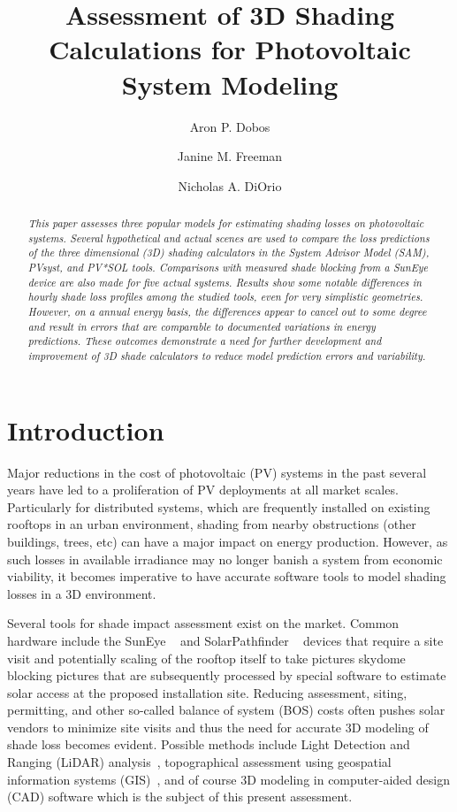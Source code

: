 \documentclass[twocolumn,10pt]{asme2ej}
\title{Assessment of 3D Shading Calculations for Photovoltaic System Modeling}
\author{Aron P. Dobos
    \affiliation{
	Senior Engineer, NREL\\
	aron.dobos@nrel.gov
    }	
}
\author{Janine M. Freeman
    \affiliation{
	Energy Modeling Engineer, NREL\\
	janine.freeman@nrel.gov
    }	
}
\author{Nicholas A. DiOrio
    \affiliation{
	Modeling and Software Engineer, NREL\\
	nicholas.diorio@nrel.gov
    }	
}
\begin{document}
\maketitle    

\begin{abstract}
{\it 
This paper assesses three popular models for estimating shading losses on photovoltaic systems.  Several hypothetical and actual scenes are used to compare the loss predictions of the three dimensional (3D) shading calculators in the System Advisor Model (SAM), PVsyst, and PV*SOL tools.   Comparisons with measured shade blocking from a SunEye device are also made for five actual systems.  Results show some notable differences in hourly shade loss profiles among the studied tools, even for very simplistic geometries.  However, on a annual energy basis, the differences appear to cancel out to some degree and result in errors that are comparable to documented variations in energy predictions.   These outcomes demonstrate a need for further development and improvement of 3D shade calculators to reduce model prediction errors and variability.
}
\end{abstract}

\section{Introduction}

Major reductions in the cost of photovoltaic (PV) systems in the past several years have led to a proliferation of PV deployments at all market scales.  Particularly for distributed systems, which are frequently installed on existing rooftops in an urban environment, shading from nearby obstructions (other buildings, trees, etc) can have a major impact on energy production.  However, as such losses in available irradiance may no longer banish a system from economic viability, it becomes imperative to have accurate software tools to model shading losses in a 3D environment.  

Several tools for shade impact assessment exist on the market.  Common hardware include the SunEye ~\cite{suneye} and SolarPathfinder ~\cite{solarpathfinder} devices that require a site visit and potentially scaling of the rooftop itself to take pictures skydome blocking pictures that are subsequently processed by special software to estimate solar access at the proposed installation site.  Reducing assessment, siting, permitting, and other so-called balance of system (BOS) costs often pushes solar vendors to minimize site visits and thus the need for accurate 3D modeling of shade loss becomes evident.  Possible methods include Light Detection and Ranging (LiDAR) analysis~\cite{jakubiec2013}, topographical assessment using geospatial information systems (GIS)~\cite{melius2013}, and of course 3D modeling in computer-aided design (CAD) software which is the subject of this present assessment.
\end{document}
